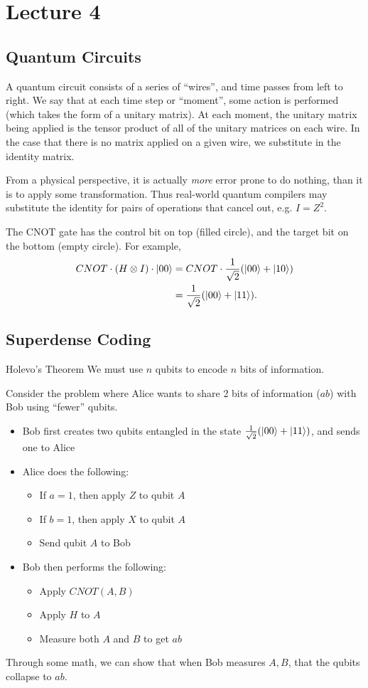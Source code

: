 \documentclass[class=article, crop=false]{standalone}
\begin{document}
  \section{Lecture 4}
  \subsection{Quantum Circuits}
  A quantum circuit consists of a series of ``wires'', and time passes from left to right. We say that at each time step or ``moment'', some action is performed (which takes the form of a unitary matrix). At each moment, the unitary matrix being applied is the tensor product of all of the unitary matrices on each wire. In the case that there is no matrix applied on a given wire, we substitute in the identity matrix.
  \begin{note}{}
    From a physical perspective, it is actually \emph{more} error prone to do nothing, than it is to apply some transformation. Thus real-world quantum compilers may substitute the identity for pairs of operations that cancel out, e.g. $I = Z^2$.
  \end{note}
  The CNOT gate has the control bit on top (filled circle), and the target bit on the bottom (empty circle). For example,
  \begin{align*}
    CNOT\cdot (H\otimes I)\cdot \left\lvert 00 \right\rangle &= CNOT\cdot \frac{1}{\sqrt{2}}(\left\lvert 00 \right\rangle + \left\lvert 10 \right\rangle) \\
                                         &= \frac{1}{\sqrt{2}}(\left\lvert 00 \right\rangle + \left\lvert 11 \right\rangle).
  \end{align*}
  \subsection{Superdense Coding}
  \begin{theorem}{Holevo's Theorem}
    We must use $n$ qubits to encode $n$ bits of information.
  \end{theorem}
  Consider the problem where Alice wants to share 2 bits of information ($ab$) with Bob using ``fewer'' qubits.
  \begin{itemize}
    \item Bob first creates two qubits entangled in the state $\frac{1}{\sqrt{2}}(\left\lvert 00 \right\rangle + \left\lvert 11 \right\rangle)$, and sends one to Alice
    \item Alice does the following:
    \begin{itemize}
      \item If $a = 1$, then apply $Z$ to qubit $A$
      \item If $b = 1$, then apply $X$ to qubit $A$
      \item Send qubit $A$ to Bob
    \end{itemize}
    \item Bob then performs the following:
    \begin{itemize}
      \item Apply $CNOT(A, B)$
      \item Apply $H$ to $A$
      \item Measure both $A$ and $B$ to get $ab$
    \end{itemize}
  \end{itemize}
  Through some math, we can show that when Bob measures $A, B$, that the qubits collapse to $ab$.
\end{document}
